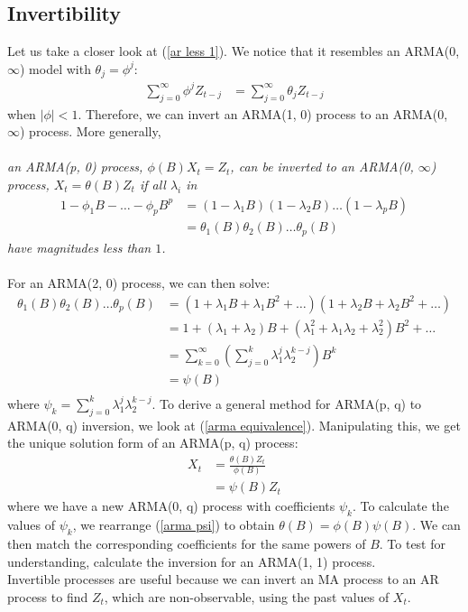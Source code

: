 \documentclass{article}
\begin{document}
\subsection{Invertibility}
Let us take a closer look at (\ref{ar less 1}). We notice that it resembles an ARMA(0, $\infty$) model with $\theta_j=\phi^j$:
\begin{align}\label{arma equivalence}
    \sum_{j=0}^{\infty} \phi^j Z_{t-j} &= \sum_{j=0}^{\infty} \theta_j Z_{t-j}
\end{align}
when $\lvert \phi \rvert < 1$. Therefore, we can invert an ARMA(1, 0) process to an ARMA(0, $\infty$) process. More generally, \\\\
\textit{an ARMA(p, 0) process, $\phi(B)X_t=Z_t$, can be inverted to an ARMA(0, $\infty$) process, $X_t=\theta(B)Z_t$ if all $\lambda_i$ in 
\begin{align}\label{arma inversion}
    1-\phi_1B-\ldots-\phi_pB^p&=(1-\lambda_1B)(1-\lambda_2B)\ldots(1-\lambda_pB)\nonumber\nonumber\\
    &= \theta_1(B)\theta_2(B)\ldots \theta_p(B)
\end{align}
have magnitudes less than $1$.\\\\
}
For an ARMA(2, 0) process, we can then solve:
\begin{align}\label{arma psi derivation}
    \theta_1(B)\theta_2(B)\ldots \theta_p(B) &= (1+\lambda_1B+\lambda_1B^2+\ldots) (1+\lambda_2B+\lambda_2B^2+\ldots) \nonumber\\
    &= 1+(\lambda_1+\lambda_2)B+(\lambda_1^2+\lambda_1\lambda_2+\lambda_2^2)B^2+\ldots\nonumber\\
    &=\sum_{k=0}^{\infty}(\sum_{j=0}^k \lambda_1^j\lambda_2^{k-j})B^k\\
    &= \psi(B)\nonumber\\
\end{align}
where $\psi_k=\sum_{j=0}^k \lambda_1^j\lambda_2^{k-j}$. To derive a general method for ARMA(p, q) to ARMA(0, q) inversion, we look at (\ref{arma equivalence}). Manipulating this, we get the unique solution form of an ARMA(p, q) process:
\begin{align}\label{arma psi}
    X_t &= \frac{\theta(B)Z_t}{\phi(B)}\nonumber\\
    &= \psi(B)Z_t
\end{align}
where we have a new ARMA(0, q) process with coefficients $\psi_k$. To calculate the values of $\psi_k$, we rearrange (\ref{arma psi}) to obtain $\theta(B)=\phi(B)\psi(B)$. We can then match the corresponding coefficients for the same powers of $B$. To test for understanding, calculate the inversion for an ARMA(1, 1) process.\\
Invertible processes are useful because we can invert an MA process to an AR process to find $Z_t$, which are non-observable, using the past values of $X_t$.
\end{document}
